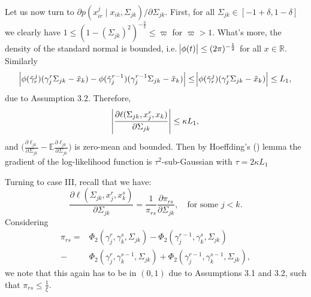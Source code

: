 \begin{condition}
    Let us now turn to $\partial p(x^j_{ir} \mid x_{ik}, \Sigma_{jk})/\partial \Sigma_{jk}$. First, for all $\Sigma_{jk} \in [-1+\delta, 1-\delta]$ we clearly have $1 \leq (1-(\Sigma_{jk})^2)^{-\frac{3}{2}} \leq \varpi$ for $\varpi > 1$. What's more, the density of the standard normal is bounded, i.e. $\abs{\phi(t)} \leq (2\pi)^{-\frac{1}{2}}$ for all $x \in \mathbb{R}$. Similarly
    \begin{equation*}
        \abs{\phi({\tilde{\gamma}}^j_{r})({\gamma}_j^r\Sigma_{jk} - {\tilde{x}}_{k}) - \phi({\tilde{\gamma}}_j^{r-1})({\gamma}_j^{r-1}\Sigma_{jk} - {\tilde{x}}_{k})} \leq  \abs{\phi({\tilde{\gamma}}^j_{r})({\gamma}_j^r\Sigma_{jk} - {\tilde{x}}_{k})} \leq L_1,
    \end{equation*}
    due to Assumption 3.2. %
    Therefore,
    \begin{equation*}
        \abs{\frac{\partial\ell(\Sigma_{jk}, x_j^r,x_k)}{\partial \Sigma_{jk}}} \leq \kappa L_1,
    \end{equation*}
    and $\Big(\frac{\partial\ell_{jk}}{\partial \Sigma_{jk}} - \mathbb{E}\frac{\partial\ell_{jk}}{\partial \Sigma_{jk}} \Big)$ is zero-mean and bounded. Then by Hoeffding's (\citeyear{Hoeffding63}) lemma  the gradient of the log-likelihood function is $\tau^2$-sub-Gaussian with $\tau = 2\kappa L_1$

    Turning to case III, recall that we have:
    \begin{equation*}
        \frac{\partial \ell(\Sigma_{jk}, x_j^r,x_k^s)}{\partial \Sigma_{jk}} = \frac{1}{\pi_{rs}} \frac{\partial \pi_{rs}}{\partial \Sigma_{jk}}, \quad \text{for some }j<k.  
    \end{equation*}
    Considering
    \begin{align*}
        \pi_{rs} = &\Phi_2({\gamma}_j^r, {\gamma}_k^s, \Sigma_{jk}) - \Phi_2({\gamma}_j^{r-1}, {\gamma}_k^s, \Sigma_{jk}) \\
        - &\Phi_2({\gamma}_j^r, {\gamma}_k^{s-1}, \Sigma_{jk}) + \Phi_2({\gamma}_j^{r-1}, {\gamma}_k^{s-1}, \Sigma_{jk}),
    \end{align*}
    we note that this again has to be in $(0,1)$ due to Assumptions 3.1 and 3.2,
    such that $\pi_{rs} \leq \frac{1}{\xi}$. %
    

\end{condition}
